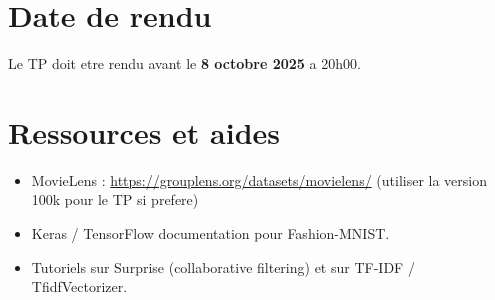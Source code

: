 \documentclass[a4paper,12pt]{article}
\begin{document}
\section*{Date de rendu}
Le TP doit etre rendu avant le \textbf{8 octobre 2025} a 20h00.

\section*{Ressources et aides}
\begin{itemize}
\item MovieLens : \url{https://grouplens.org/datasets/movielens/} (utiliser la version 100k pour le TP si prefere)
\item Keras / TensorFlow documentation pour Fashion-MNIST.
\item Tutoriels sur Surprise (collaborative filtering) et sur TF-IDF / TfidfVectorizer.
\end{itemize}
\end{document}
